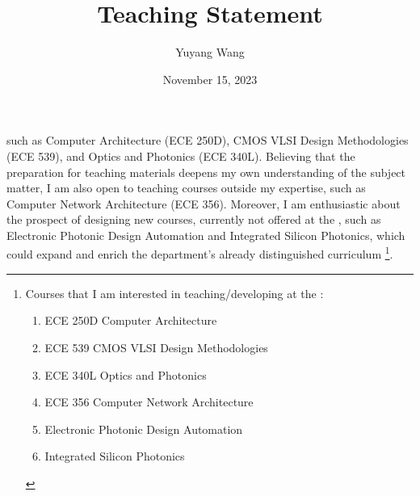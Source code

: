 



\title{Teaching Statement}

\def\courseOneName{Computer Architecture}
\def\courseOneNumber{ECE 250D}
\def\courseTwoName{CMOS VLSI Design Methodologies}
\def\courseTwoNumber{ECE 539}
\def\courseThreeName{Optics and Photonics}
\def\courseThreeNumber{ECE 340L}
\def\courseFourName{Computer Network Architecture}
\def\courseFourNumber{ECE 356}
\def\courseSixName{Electronic Photonic Design Automation}
\def\courseSevenName{Integrated Silicon Photonics}

\def\rsCustom{%
such as \courseOneName{} (\courseOneNumber{}), \courseTwoName{} (\courseTwoNumber{}), and \courseThreeName{} (\courseThreeNumber{}). Believing that the preparation for teaching materials deepens my own understanding of the subject matter, I am also open to teaching courses outside my expertise, such as \courseFourName{} (\courseFourNumber{}). Moreover, I am enthusiastic about the prospect of designing new courses, currently not offered at the \appSchool{}, such as \courseSixName{} and \courseSevenName{}, which could expand and enrich the department's already distinguished curriculum%
\footnote[][-1.6in]{%
Courses that I am interested in teaching/developing at the \appDept{}:
\begin{enumerate}
    \item \courseOneNumber{} \courseOneName{}
    \item \courseTwoNumber{} \courseTwoName{}
    \item \courseThreeNumber{} \courseThreeName{}
    \item \courseFourNumber{} \courseFourName{}
    \item \courseSixName{}
    \item \courseSevenName{}
\end{enumerate}
}.
}

\author{Yuyang Wang}
\date{November 15, 2023}
\makeatletter
\fancyfoot[L]{\scshape \MakeLowercase{\@author}}
\fancyfoot[R]{{\scshape \MakeLowercase{\@title}}\quad{\fontsize{16}{20}\selectfont\sfrac{\thepage}{\pageref*{LastPage}}}\hspace{0.25in}}
\makeatother



\maketitle%


\rsCustom{}


\footnotesize
{}

